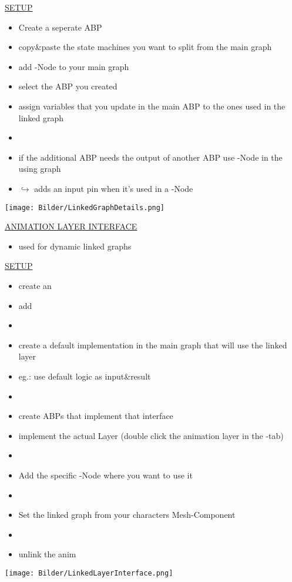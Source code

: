         \uline{SETUP}
        \begin{itemize}
            \item Create a seperate ABP
            \item copy\&paste the state machines you want to split from the main graph
            \item add -Node to your main graph
            \item select the ABP you created
            \item assign variables that you update in the main ABP to the ones used in the linked graph
            \item 
            \item if the additional ABP needs the output of another ABP use -Node in the using graph
            \item $\hookrightarrow$ adds an input pin when it's used in a -Node
        \end{itemize}
            \texttt{[image: Bilder/LinkedGraphDetails.png]}

        \uline{ANIMATION LAYER INTERFACE}
        \begin{itemize}
            \item used for dynamic linked graphs
        \end{itemize}

        \uline{SETUP}
        \begin{itemize}
            \item create an 
            \item add 
            \item 
            \item create a default implementation in the main graph that will use the linked layer
            \item eg.: use default logic as input\&result
            \item 
            \item create ABPs that implement that interface
            \item implement the actual Layer (double click the animation layer in the -tab)
            \item 
            \item Add the specific -Node where you want to use it
            \item 
            \item Set the linked graph from your characters Mesh-Component
            \item 
            \item unlink the anim
        \end{itemize}
            \texttt{[image: Bilder/LinkedLayerInterface.png]}


